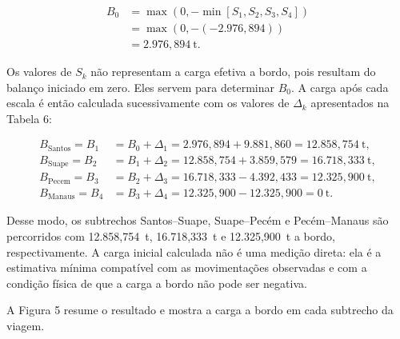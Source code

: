 \documentclass[brazil,]{article}
\begin{document}
\[
\begin{aligned}
B_0
&=\max\left(0,-\min[S_1,S_2,S_3,S_4]\right)\\
&=\max\left(0,-(-2{.}976{,}894)\right)\\
&=2{.}976{,}894\ \mathrm{t}.
\end{aligned}
\]

Os valores de \(S_k\) não representam a carga efetiva a bordo, pois
resultam do balanço iniciado em zero. Eles servem para determinar
\(B_0\). A carga após cada escala é então calculada sucessivamente com os
valores de \(\Delta_k\) apresentados na Tabela 6:

\[
\begin{aligned}
B_{\mathrm{Santos}}=B_1
&=B_0+\Delta_1
=2{.}976{,}894+9{.}881{,}860
=12{.}858{,}754\ \mathrm{t},\\
B_{\mathrm{Suape}}=B_2
&=B_1+\Delta_2
=12{.}858{,}754+3{.}859{,}579
=16{.}718{,}333\ \mathrm{t},\\
B_{\mathrm{Pecem}}=B_3
&=B_2+\Delta_3
=16{.}718{,}333-4{.}392{,}433
=12{.}325{,}900\ \mathrm{t},\\
B_{\mathrm{Manaus}}=B_4
&=B_3+\Delta_4
=12{.}325{,}900-12{.}325{,}900
=0\ \mathrm{t}.
\end{aligned}
\]

Desse modo, os subtrechos Santos--Suape, Suape--Pecém e Pecém--Manaus
são percorridos com 12.858,754~t, 16.718,333~t e 12.325,900~t a bordo,
respectivamente. A carga inicial calculada não é uma medição direta: ela
é a estimativa mínima compatível com as movimentações observadas e com a
condição física de que a carga a bordo não pode ser negativa.

A Figura 5 resume o resultado e mostra a carga a bordo em cada subtrecho
da viagem.

\begin{center}
\end{center}
\end{document}

